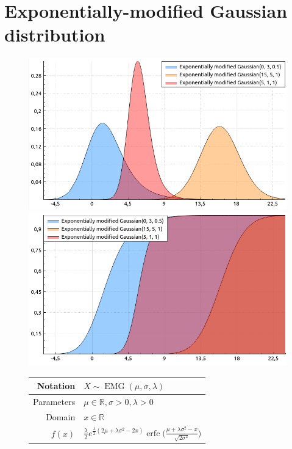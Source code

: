 \documentclass[a4paper,11pt]{article}
\theoremstyle{plain}
\theoremstyle{definition}
\newcommand{\MR}{\mathbb{R}}
\begin{document}
	\section{Exponentially-modified Gaussian distribution}
	\begin{figure}[!htb]\centering
		\begin{minipage}{0.55\textwidth}
			\includegraphics[width=\linewidth, right]{emg_pdf}
			\captionsetup{labelformat=empty}
			\includegraphics[width=\linewidth, right]{emg_cdf}
			\captionsetup{labelformat=empty}
		\end{minipage}
		\begin{minipage}{0.4\textwidth}
		\begin{tabular}{| r | l |}
			\hline
			Notation & $X \sim \operatorname{EMG}(\mu, \sigma, \lambda)$ \\
			\hline
			Parameters & $\mu \in \MR, \sigma > 0, \lambda > 0$ \\
			\hline
			Domain & $x \in \MR$  \\
			\hline
			$f(x)$ & $ \frac{\lambda}{2} e^{\frac{\lambda}{2}(2\mu + \lambda \sigma^2 - 2x)} \operatorname{erfc} \Big( \frac{\mu + \lambda \sigma^2 - x}{\sqrt{2\sigma^2}} \Big) $ \\

\end{tabular}
\end{minipage}
\end{figure}
\end{document}
